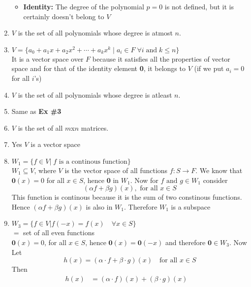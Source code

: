 \documentclass[a4paper, titlepage]{article}
\begin{document}
\begin{enumerate}[label=\textbf{\arabic*.}]
\begin{itemize}
        \item \textbf{Identity: } The degree of the polynomial $p = 0$
        is not defined, but it is certainly doesn't belong to $V$
    \end{itemize}
    \item $V$ is the set of all polynomials whose degree is atmost $n$.
    \item[]
    $V = \{ a_0 + a_1x + a_2x^2 + \cdots + a_kx^k \; | \; a_i \in F \; \forall i \; \text{and} \; k \le n \} $ \hfill \\ 
    It is a vector space over $F$ because it 
    satisfies all the properties of vector space and for that of the
    identity element \textbf{0}, it belongs to $V$ (if we put $a_i = 0$ for all $i$'s)
    \item $V$ is the set of all polynomials whose degree is atleast $n$.
    \item[] Same as \textbf{Ex \#3} 
    \item $V$ is the set of all $m$x$n$ matrices.
    \item[] Yes $V$ is a vector space
    \begin{center}
        \date{$9^{\text{th}}$ September}
    \end{center}
    \item $W_1 = \{ f \in V \vert \; f \text{ is a continous function} \}$ \hfill \\
    $W_1 \subseteq V$, where $V$ is the vector space of all functions $f: S \rightarrow F$.
    We know that \hfill \\
    $\textbf{0}(x) = 0$ for all $x \in S$, hence \textbf{0} in $W_1$. Now 
    for $f \text{ and } g \in W_1$ consider
    \[ (\alpha f + \beta g)(x), \text{ for all } x \in S \]
    This function is continous because it is the sum of two 
    constinous functions. Hence \( (\alpha f + \beta g)(x) \) is also
    in $W_1$. Therefore $W_1$ is a subspace
    \item $W_3 = \{ f \in V \left. \right\vert f(-x) = f(x) \quad \forall x \in S \} $ \hfill \\
    $ = $ set of all even functions \hfill \\
    $\textbf{0}(x) = 0$, for all $x \in S$, hence 
    $\textbf{0}(x) = \textbf{0}(-x)$ and therefore $\textbf{0} \in W_3$. Now Let
    \[ h(x) = (\alpha\cdot f + \beta\cdot g)(x) \quad \text{for all } x \in S\]
    Then
    \begin{align*}
        h(x) &= (\alpha\cdot f)(x) + (\beta\cdot g)(x) \quad \\

\end{align*}
\end{enumerate}
\end{document}
